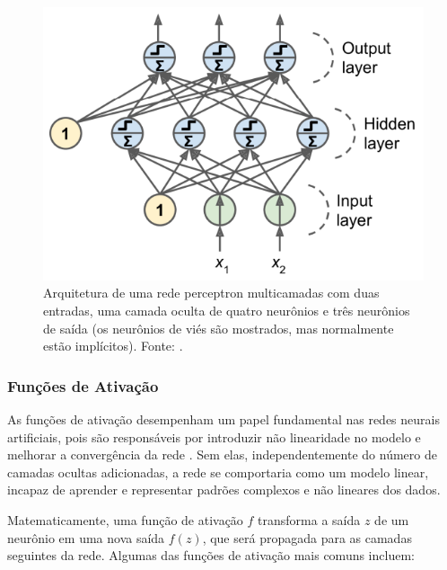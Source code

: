 \begin{figure}[h]
    \centering
    \includegraphics[width=\linewidth]{figs/multilayer-perceptron.png}
    \caption{Arquitetura de uma rede perceptron multicamadas com duas entradas, uma camada oculta de quatro neurônios e três neurônios de saída (os neurônios de viés são mostrados, mas normalmente estão implícitos). Fonte: \cite{AurlienGron2019}.}
    \label{fig:multilayer-perceptron}
\end{figure}

\subsubsection{Funções de Ativação}

As funções de ativação desempenham um papel fundamental nas redes neurais artificiais, pois são responsáveis por introduzir não linearidade no modelo e melhorar a convergência da rede \citep{Dubey2022}. Sem elas, independentemente do número de camadas ocultas adicionadas, a rede se comportaria como um modelo linear, incapaz de aprender e representar padrões complexos e não lineares dos dados.

Matematicamente, uma função de ativação $f$ transforma a saída $z$ de um neurônio em uma nova saída $f(z)$, que será propagada para as camadas seguintes da rede. Algumas das funções de ativação mais comuns incluem:

